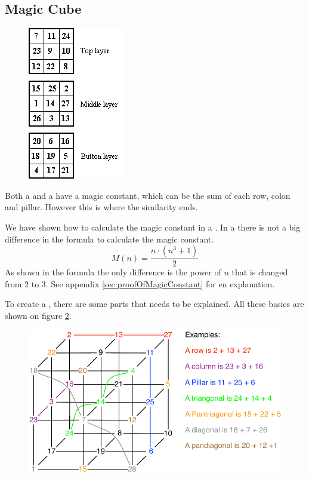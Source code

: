 \subsection{Magic Cube}

\begin{figure}[h]
	\centering
		\includegraphics[scale=0.8]{input/pics/presentMagicCube}
	\caption{}
	\label{fig:presentMagicCube}
\end{figure}

Both a \msqaure{} and a \mcube{} have a magic constant, which can be the sum of each row, colon and pillar. However this is where the similarity ends.

We have shown how to calculate the magic constant in a \msquare{}.
In a  \mcube{} there is not a big difference in the formula to calculate the magic constant.
\begin{equation}
	M(n)=\frac{n \cdot (n^3+1)}{2}
\end{equation}
As shown in the formula the only difference is the power of $n$ that is changed from 2 to 3.
See appendix \ref{sec:proofOfMagicConstant} for en explanation.

To create a  \mcube{}, there are some parts that needs to be explained.
All these basics are shown on figure \ref{fig:cubeparts}.

\begin{figure}[h]
	\centering
		\includegraphics[scale=0.3]{input/pics/cubeparts}
	\caption{}
	\label{fig:cubeparts}
\end{figure}


